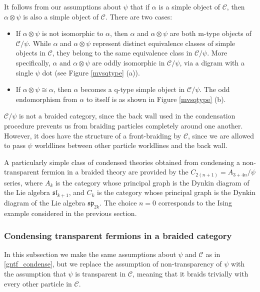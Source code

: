 \documentclass[12pt,a4paper]{article}
\newcommand{\mcc}{\mathcal{C}}
\newcommand{\ot}{\otimes}
\begin{document}
It follows from our assumptions about $\psi$ that if $\alpha$ is a simple object of $\mcc$, then
$\alpha\ot\psi$ is also a simple object of $\mcc$.
There are two cases:
\begin{itemize}
	\item If $\alpha\ot\psi$ is not isomorphic to $\alpha$, then $\alpha$ and $\alpha\ot\psi$ are both m-type
	objects of $\mcc/\psi$.
	While $\alpha$ and $\alpha\ot\psi$ represent distinct equivalence classes of simple objects in $\mcc$,
	they belong to the same equivalence class in $\mcc/
	\psi$.
	More specifically, $\alpha$ and $\alpha\ot\psi$ are oddly isomorphic in $\mcc/\psi$, 
	via a digram with a single $\psi$ dot (see Figure \ref{mvsqtype} (a)).
	\item If $\alpha\ot\psi \cong \alpha$, then $\alpha$ becomes a q-type simple object in $\mcc/\psi$.
	The odd endomorphism from $\alpha$ to itself is as shown in Figure \ref{mvsqtype} (b).
\end{itemize}

\medskip

$\mcc/\psi$ is not a braided category, since the back wall used in the condensation procedure 
prevents us from braiding particles completely around one another. 
However, it does have the structure of a front-braiding by $\mcc$, since we are allowed to 
pass $\psi$ worldlines between other particle worldlines and the back wall. 

\medskip


A particularly simple class of condensed theories obtained from condensing a non-
transparent fermion in a braided theory are provided by the $C_{2(n+1)} = A_{3+4n} / \psi$ series, 
where $A_k$ is the category whose principal graph is the Dynkin diagram of the Lie algebra $\mathfrak{sl}_{k+1}$, 
and $C_k$ is the category whose principal graph is the Dynkin 
diagram of the Lie algebra $\mathfrak{sp}_{2k}$.
The choice $n=0$ 
corresponds to the Ising example considered in the previous section. 


\subsubsection{Condensing transparent fermions in a braided category}
\label{condense_transparent_fermion}

In this subsection we make the same assumptions about $\psi$ and $\mcc$ as in \ref{gntf_condense}, 
but we replace the assumption of non-transparency of $\psi$ with the 
assumption that $\psi$ is transparent in $\mcc$, meaning that it braids trivially with every other particle in $\mcc$.
\end{document}

